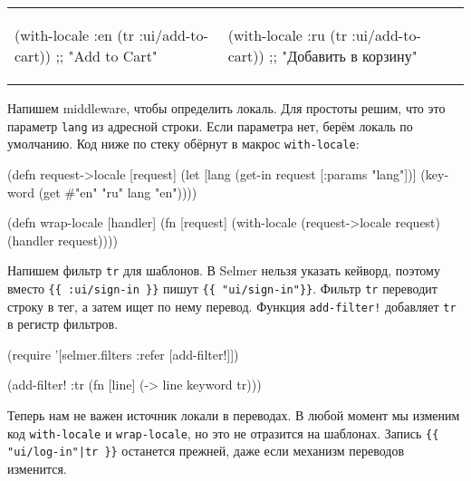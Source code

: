 
\noindent
\begin{tabular}{ @{}p{5cm} @{}p{5cm} }

\begin{english}
  \begin{clojure}
(with-locale :en
  (tr :ui/add-to-cart))
;; "Add to Cart"
  \end{clojure}
\end{english}

&

  \begin{clojure}
(with-locale :ru
  (tr :ui/add-to-cart))
;; "Добавить в корзину"
  \end{clojure}

\end{tabular}

Напишем middleware, чтобы определить локаль. Для простоты решим, что это
параметр \verb|lang| из адресной строки. Если параметра нет, берём локаль по
умолчанию. Код ниже по стеку обёрнут в макрос \verb|with-locale|:

\begin{english}
  \begin{clojure}
(defn request->locale [request]
  (let [lang (get-in request [:params "lang"])]
    (keyword (get #{"en" "ru"} lang "en"))))

(defn wrap-locale [handler]
  (fn [request]
    (with-locale (request->locale request)
      (handler request))))
  \end{clojure}
\end{english}

Напишем фильтр \verb|tr| для шаблонов. В Selmer нельзя указать кейворд,
поэтому вместо \verb|{{ :ui/sign-in }}| пишут \verb|{{ "ui/sign-in"}}|.
Фильтр \verb|tr| переводит строку в тег, а затем ищет по нему
перевод. Функция \verb|add-filter!| добавляет \verb|tr| в регистр фильтров.

\begin{english}
  \begin{clojure}
(require '[selmer.filters :refer [add-filter!]])

(add-filter! :tr
 (fn [line]
   (-> line keyword tr)))
  \end{clojure}
\end{english}

Теперь нам не важен источник локали в переводах. В любой момент мы изменим код
\verb|with-locale| и \verb|wrap-locale|, но это не отразится на
шаблонах. Запись \verb={{ "ui/log-in"|tr }}= останется прежней, даже если
механизм переводов изменится.

